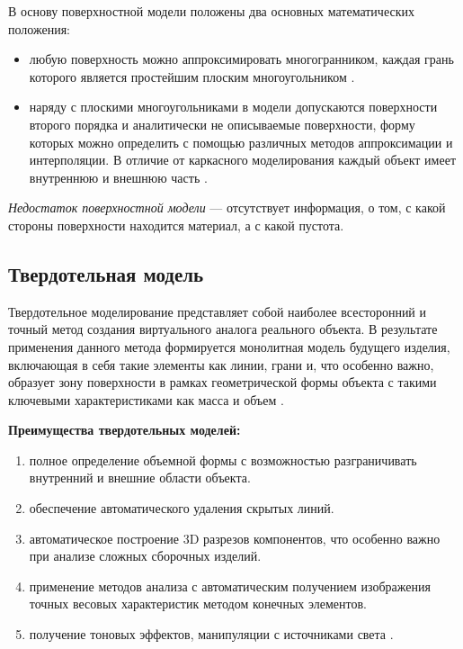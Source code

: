 \clearpage

В основу поверхностной модели положены два основных математических положения:
\begin{itemize}
\item любую поверхность можно аппроксимировать
многогранником, каждая грань которого является простейшим плоским
многоугольником \cite{model_geom_01}.
\item наряду с плоскими многоугольниками в модели допускаются поверхности второго порядка и аналитически не описываемые поверхности, форму которых можно определить с помощью различных методов аппроксимации и интерполяции. В отличие от каркасного моделирования каждый объект имеет внутреннюю и внешнюю часть \cite{model_geom_01}.
\end{itemize}


\textit{Недостаток поверхностной модели} --- отсутствует информация, о том, с какой стороны поверхности находится материал, а с какой пустота.

\subsection{Твердотельная модель}

Твердотельное моделирование представляет собой наиболее всесторонний и точный метод создания виртуального аналога реального объекта. В результате применения данного метода формируется монолитная модель будущего изделия, включающая в себя такие элементы как линии, грани и, что особенно важно, образует зону поверхности в рамках геометрической формы объекта с такими ключевыми характеристиками как масса и объем \cite{model_geom_01}.

\textbf{Преимущества твердотельных моделей:}
\begin{enumerate}
\item полное определение объемной формы с возможностью разграничивать внутренний и внешние области объекта.
\item  обеспечение автоматического удаления скрытых линий.
\item автоматическое построение 3D разрезов компонентов, что особенно важно при анализе сложных сборочных изделий.
\item  применение методов анализа с автоматическим получением изображения точных весовых характеристик методом конечных элементов.
\item получение тоновых эффектов, манипуляции с источниками
света \cite{model_geom_01}.
\end{enumerate}


